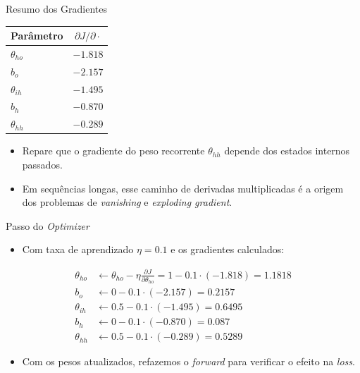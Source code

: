 \documentclass[aspectratio=169,xcolor=dvipsnames]{beamer}
\begin{document}
\begin{frame}{Resumo dos Gradientes}
\centering
\begin{tabular}{l c}
    \toprule
    Parâmetro & $\partial J / \partial \cdot$ \\
    \midrule
    $\theta_{ho}$ & $-1.818$ \\
    $b_{o}$       & $-2.157$ \\
    $\theta_{ih}$ & $-1.495$ \\
    $b_{h}$       & $-0.870$ \\
    $\theta_{hh}$ & $-0.289$ \\
    \bottomrule
\end{tabular}
\vspace{0.6em}
\begin{itemize}
    \item Repare que o gradiente do peso recorrente $\theta_{hh}$ depende dos estados internos passados.
    \item Em sequências longas, esse caminho de derivadas multiplicadas é a origem dos problemas de \textit{vanishing} e \textit{exploding gradient}.
\end{itemize}
\end{frame}

\begin{frame}{Passo do \textit{Optimizer}}
\begin{itemize}
    \item Com taxa de aprendizado $\eta = 0.1$ e os gradientes calculados:
\end{itemize}
{\small
\begin{align*}
    \theta_{ho} &\leftarrow \theta_{ho} - \eta \frac{\partial J}{\partial \theta_{ho}} = 1 - 0.1\cdot(-1.818) = 1.1818 \\
    b_{o}       &\leftarrow 0 - 0.1\cdot(-2.157) = 0.2157 \\
    \theta_{ih} &\leftarrow 0.5 - 0.1\cdot(-1.495) = 0.6495 \\
    b_{h}       &\leftarrow 0 - 0.1\cdot(-0.870) = 0.087 \\
    \theta_{hh} &\leftarrow 0.5 - 0.1\cdot(-0.289) = 0.5289
\end{align*}
}
\begin{itemize}
    \item Com os pesos atualizados, refazemos o \textit{forward} para verificar o efeito na \textit{loss}.
\end{itemize}
\end{frame}
\end{document}
